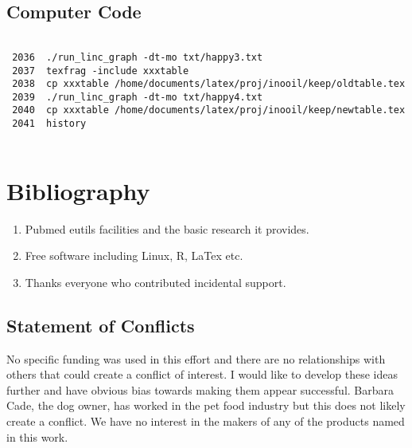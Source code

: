\subsection{Computer Code}


\begin{lstlisting}

 2036  ./run_linc_graph -dt-mo txt/happy3.txt 
 2037  texfrag -include xxxtable 
 2038  cp xxxtable /home/documents/latex/proj/inooil/keep/oldtable.tex
 2039  ./run_linc_graph -dt-mo txt/happy4.txt 
 2040  cp xxxtable /home/documents/latex/proj/inooil/keep/newtable.tex
 2041  history


\end{lstlisting}
\section{Bibliography}






\begin{acknowledgments} 

% 
\begin{enumerate}
\item Pubmed eutils facilities and the basic research it provides. 
\item Free software including Linux, R, LaTex  etc.
\item Thanks everyone who contributed incidental support. 
\end{enumerate}

\end{acknowledgments}

\clearpage
\appendix

\begin{mdpicomment}

\section{ Statement of Conflicts }
 No specific funding was used in this effort and there are no relationships
with others that could create a conflict of interest. I would like to develop
these ideas further and have obvious bias towards making them appear 
successful. Barbara Cade, the dog owner, has worked in the pet food industry
but this does not likely create a conflict. We have no interest in the
makers of any of the products named in this work.  

\end{mdpicomment}

